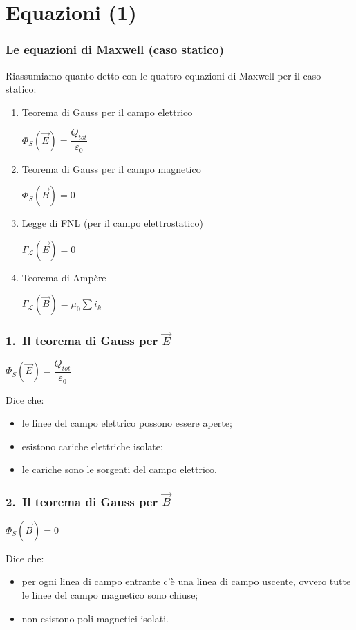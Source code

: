 \documentclass[]{beamer}
\theoremstyle{plain}
\begin{document}
\section{Equazioni (1)}

\begin{frame}
\frametitle{Le equazioni di Maxwell (caso statico)}
  Riassumiamo quanto detto con le \alert{quattro equazioni di Maxwell} per il caso statico:\pause
\begin{enumerate}
  \item Teorema di Gauss per il campo elettrico
  \begin{center}
  \colorbox{blue!30}{$ \Phi_S (\vec{E}) = \dfrac{Q_{tot}}{\varepsilon_0} $}
  \end{center}\pause
  \item Teorema di Gauss per il campo magnetico
  \begin{center}
  \colorbox{blue!30}{$ \Phi_S (\vec{B}) = 0 $}
  \end{center}\pause
  \item Legge di FNL (per il campo elettrostatico)
  \begin{center}
\colorbox{blue!30}{  $ \Gamma_\mathscr{L} (\vec{E}) = 0 $}
  \end{center}\pause
  \item Teorema di Ampère
  \begin{center}
  \colorbox{blue!30}{$ \Gamma_\mathscr{L} (\vec{B}) = \mu_0 \sum\limits i_k $}
  \end{center}
\end{enumerate}
\end{frame}

\begin{frame}
  \frametitle{1.~Il teorema di Gauss per $ \vec{E} $}
    \begin{center}
  \colorbox{blue!30}{$ \Phi_S (\vec{E}) = \dfrac{Q_{tot}}{\varepsilon_0} $}
  \end{center}\pause
  Dice che:
  \begin{itemize}
    \item le linee del campo elettrico possono essere aperte;\pause
    \item esistono cariche elettriche isolate;\pause
    \item le cariche sono le sorgenti del campo elettrico.
  \end{itemize}
\end{frame}

\begin{frame}
  \frametitle{2.~Il teorema di Gauss per $ \vec{B} $}
    \begin{center}
  \colorbox{blue!30}{$ \Phi_S (\vec{B}) = 0 $}
  \end{center}\pause
  Dice che:
  \begin{itemize}
    \item per ogni linea di campo entrante c'è una linea di campo uscente, ovvero tutte le linee del campo magnetico sono chiuse;\pause
    \item non esistono poli magnetici isolati.
  \end{itemize}
\end{frame}
\end{document}
